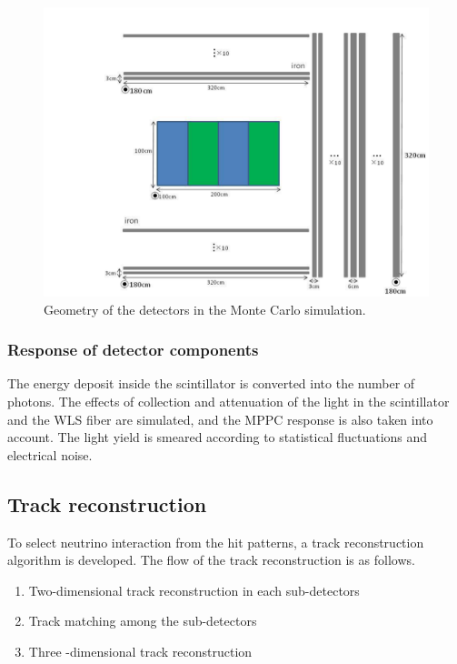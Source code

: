 \begin{figure}[tbh]
\begin{center}
\includegraphics[width=0.8\linewidth]{fig/wagasci_mc_geometry.pdf}
\end{center}
\caption{
Geometry of the detectors in the Monte Carlo simulation.}
\label{fig:wagasci_mc_geometry}
\end{figure}




\subsubsection{Response of detector components}
The energy deposit inside the scintillator is converted into the number of photons. 
The effects of collection and attenuation of the light in the scintillator and the WLS fiber are simulated, and the MPPC response is also taken into account. 
The light yield is smeared according to statistical fluctuations and electrical noise.


\subsection{Track reconstruction}
To select neutrino interaction from the hit patterns, a track reconstruction algorithm is developed.
The flow of the track reconstruction is as follows.
\begin{enumerate}
\item Two-dimensional track reconstruction in each sub-detectors
\item Track matching among the sub-detectors
\item Three -dimensional track reconstruction
\end{enumerate}

